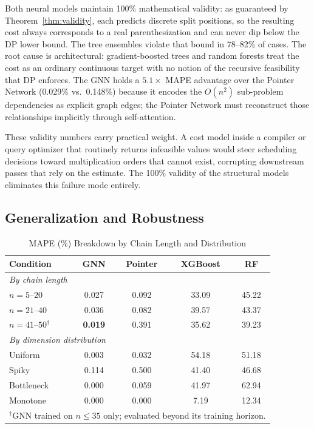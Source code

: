 \documentclass[conference]{IEEEtran}
\begin{document}
Both neural models maintain 100\% mathematical validity: as guaranteed by
Theorem~\ref{thm:validity}, each predicts discrete split positions, so the
resulting cost always corresponds to a real parenthesization and can never dip
below the DP lower bound. The tree ensembles violate that bound in 78--82\% of
cases. The root cause is architectural: gradient-boosted trees and random
forests treat the cost as an ordinary continuous target with no notion of the
recursive feasibility that DP enforces. The GNN holds a $5.1\times$ MAPE
advantage over the Pointer Network (0.029\% vs.\ 0.148\%) because it encodes
the $O(n^2)$ sub-problem dependencies as explicit graph edges; the Pointer
Network must reconstruct those relationships implicitly through
self-attention.

These validity numbers carry practical weight. A cost model inside a compiler
or query optimizer that routinely returns infeasible values would steer
scheduling decisions toward multiplication orders that cannot exist,
corrupting downstream passes that rely on the estimate. The 100\% validity of
the structural models eliminates this failure mode entirely.

\subsection{Generalization and Robustness}

\begin{table}[t]
\caption{MAPE (\%) Breakdown by Chain Length and Distribution}
\label{tab:breakdown}
\centering
\begin{tabular}{lcccc}
\toprule
Condition & GNN & Pointer & XGBoost & RF \\
\midrule
\multicolumn{5}{l}{\emph{By chain length}} \\
$n{=}5$--$20$ & 0.027 & 0.092 & 33.09 & 45.22 \\
$n{=}21$--$40$ & 0.036 & 0.082 & 39.57 & 43.37 \\
$n{=}41$--$50^{\dagger}$ & \textbf{0.019} & 0.391 & 35.62 & 39.23 \\
\midrule
\multicolumn{5}{l}{\emph{By dimension distribution}} \\
Uniform    & 0.003 & 0.032 & 54.18 & 51.18 \\
Spiky      & 0.114 & 0.500 & 41.40 & 46.68 \\
Bottleneck & 0.000 & 0.059 & 41.97 & 62.94 \\
Monotone   & 0.000 & 0.000 & 7.19  & 12.34 \\
\bottomrule
\multicolumn{5}{l}{\footnotesize $^{\dagger}$GNN trained on $n \le 35$ only; evaluated beyond its training horizon.}
\end{tabular}
\end{table}
\end{document}

